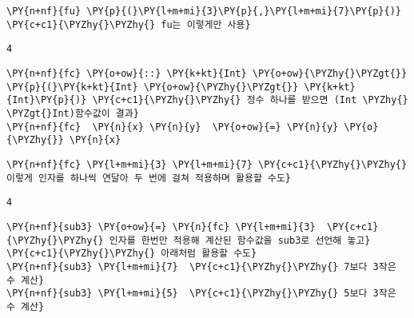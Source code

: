     \begin{tcolorbox}[breakable, size=fbox, boxrule=1pt, pad at break*=1mm,colback=cellbackground, colframe=cellborder, top=.75ex]
\begin{Verbatim}[commandchars=\\\{\}]
\PY{n+nf}{fu} \PY{p}{(}\PY{l+m+mi}{3}\PY{p}{,}\PY{l+m+mi}{7}\PY{p}{)} \PY{c+c1}{\PYZhy{}\PYZhy{} fu는 이렇게만 사용}
\end{Verbatim}
\end{tcolorbox}

    
    \begin{Verbatim}[commandchars=\\\{\}]
4
    \end{Verbatim}

    
    \begin{tcolorbox}[breakable, size=fbox, boxrule=1pt, pad at break*=1mm,colback=cellbackground, colframe=cellborder, top=.75ex]
\begin{Verbatim}[commandchars=\\\{\}]
\PY{n+nf}{fc} \PY{o+ow}{::} \PY{k+kt}{Int} \PY{o+ow}{\PYZhy{}\PYZgt{}} \PY{p}{(}\PY{k+kt}{Int} \PY{o+ow}{\PYZhy{}\PYZgt{}} \PY{k+kt}{Int}\PY{p}{)} \PY{c+c1}{\PYZhy{}\PYZhy{} 정수 하나를 받으면 (Int \PYZhy{} \PYZgt{}Int)함수값이 결과}
\PY{n+nf}{fc}  \PY{n}{x} \PY{n}{y}  \PY{o+ow}{=} \PY{n}{y} \PY{o}{\PYZhy{}} \PY{n}{x}
\end{Verbatim}
\end{tcolorbox}

    \begin{tcolorbox}[breakable, size=fbox, boxrule=1pt, pad at break*=1mm,colback=cellbackground, colframe=cellborder, top=.75ex]
\begin{Verbatim}[commandchars=\\\{\}]
\PY{n+nf}{fc} \PY{l+m+mi}{3} \PY{l+m+mi}{7} \PY{c+c1}{\PYZhy{}\PYZhy{} 이렇게 인자를 하나씩 연달아 두 번에 걸쳐 적용하며 활용할 수도}
\end{Verbatim}
\end{tcolorbox}

    
    \begin{Verbatim}[commandchars=\\\{\}]
4
    \end{Verbatim}

    
    \begin{tcolorbox}[breakable, size=fbox, boxrule=1pt, pad at break*=1mm,colback=cellbackground, colframe=cellborder, top=.75ex]
\begin{Verbatim}[commandchars=\\\{\}]
\PY{n+nf}{sub3} \PY{o+ow}{=} \PY{n}{fc} \PY{l+m+mi}{3}  \PY{c+c1}{\PYZhy{}\PYZhy{} 인자를 한번만 적용해 계산된 함수값을 sub3로 선언해 놓고}
\PY{c+c1}{\PYZhy{}\PYZhy{} 아래처럼 활용할 수도}
\PY{n+nf}{sub3} \PY{l+m+mi}{7}  \PY{c+c1}{\PYZhy{}\PYZhy{} 7보다 3작은 수 계산}
\PY{n+nf}{sub3} \PY{l+m+mi}{5}  \PY{c+c1}{\PYZhy{}\PYZhy{} 5보다 3작은 수 계산}
\end{Verbatim}
\end{tcolorbox}

